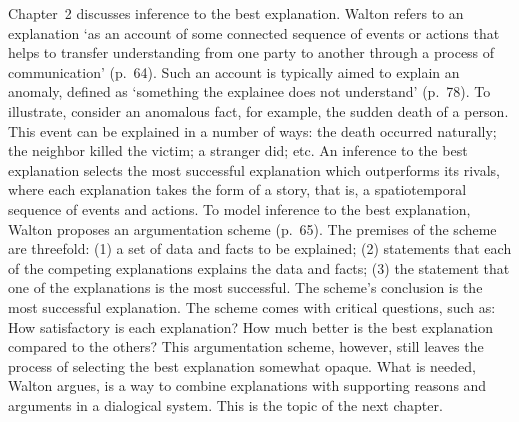 \documentclass[12pt,a4paper]{article}
\begin{document}
Chapter~2 discusses inference to the best explanation. Walton refers to an explanation 
`as an account of some connected sequence of events or actions that helps to transfer understanding 
from one party to another through a process of communication' (p.\ 64). 
Such an account is typically aimed to explain an anomaly, defined as 
`something the explainee does not understand' %
(p.\ 78). 
To illustrate, consider an
anomalous fact, for example, the sudden death of a person. This event can be explained in a number of ways: 
the death occurred naturally; 
the neighbor killed the victim; a stranger did; etc. An inference to the best explanation selects the
most successful explanation which outperforms its rivals, where each explanation takes
the form of a story, that is, a spatiotemporal sequence of events and actions.
To model inference to the best explanation, Walton proposes 
an argumentation scheme (p.\ 65). The premises of the scheme are threefold: (1) 
a set of data and facts to be explained; (2) statements that each of the competing explanations explains 
the data and facts; (3) the statement that one of the explanations is the most successful. 
The scheme's conclusion is the most successful explanation. The scheme comes with critical questions, such as: 
How satisfactory is each explanation? How much better is the best explanation compared to the others? 
This %
argumentation scheme, however, still leaves the process of selecting the best explanation somewhat opaque. 
What is needed, Walton argues, is a way to combine explanations with supporting 
reasons and arguments in a dialogical system. This
is the topic of the next chapter.
\end{document}
